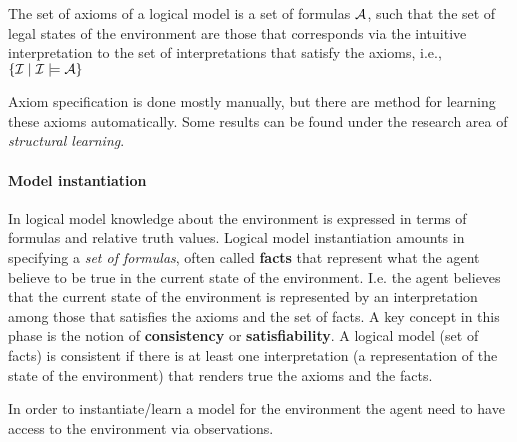 \begin{itemize}
  \begin{definition}[Axioms]
    The set of axioms of a logical model is a set of formulas
    $\mathcal{A}$, such that the set of legal states of the environment
    are those that corresponds via the intuitive interpretation to the
    set of interpretations that satisfy the axioms, i.e.,
    $\{\mathcal{I} \mid \mathcal{I}\models \mathcal{A}\}$
  \end{definition}

   Axiom
  specification is done mostly manually, but there are method for
  learning these axioms automatically. Some results can be found under
  the research area of \emph{structural learning}.

\end{itemize}

\paragraph{Model instantiation}
In logical model knowledge about the environment is expressed in terms
of formulas and relative truth values. Logical model instantiation
amounts in specifying a \emph{set of formulas}, often called
\textbf{facts} that represent what the agent believe to be true in the
current state of the environment. I.e. the agent believes that the
current state of the environment is represented by an interpretation
among those that satisfies the axioms and the set of facts.
A key concept in this phase is the notion of \textbf{consistency} or
\textbf{satisfiability}. A logical model (set of facts) is consistent
if there is at least one interpretation (a representation of the state
of the environment) that renders true the axioms and the facts. 

In order to instantiate/learn a model for the environment the agent
need to have access to the environment via observations. 
\begin{center}
\end{center}

